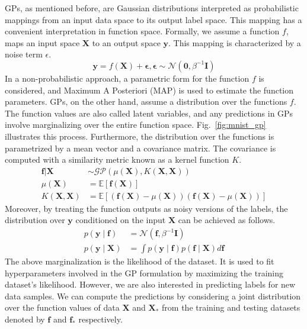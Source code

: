 \documentclass[letterpaper,11pt]{extarticle}
\begin{document}
GPs, as mentioned before, are Gaussian distributions interpreted as probabilistic mappings from an input data space to its output label space. This mapping has a convenient interpretation in function space. Formally, we assume a function $f$, maps an input space $\mathbf{X}$ to an output space $\mathbf{y}$. This mapping is characterized by a noise term $\epsilon$.
$$
\mathbf{y}=f(\mathbf{X})+\boldsymbol{\epsilon}, \boldsymbol{\epsilon} \sim \mathcal{N}\left(\mathbf{0}, \beta^{-1} \mathbf{I}\right)
$$
In a non-probabilistic approach, a parametric form for the function $f$ is considered, and Maximum A Posteriori (MAP) is used to estimate the function parameters. GPs, on the other hand, assume a distribution over the functions $f$. The function values are also called latent variables, and any predictions in GPs involve marginalizing over the entire function space. Fig.~\ref{fig:mnist_gp} illustrates this process. Furthermore, the distribution over the functions is parametrized by a mean vector and a covariance matrix. The covariance is computed with a similarity metric known as a kernel function $K$.  
$$
\begin{aligned}\mathbf{f}|\mathbf{X} & \sim \mathcal{G} \mathcal{P}\left(\mu(\mathbf{X}), K\left(\mathbf{X}, \mathbf{X}\right)\right) \\
\mu(\mathbf{X}) &=\mathbb{E}[\mathbf{f}(\mathbf{X})] \\
K\left(\mathbf{X}, \mathbf{X}\right) &=\mathbb{E}\left[(\mathbf{f}(\mathbf{X})-\mu(\mathbf{X}))\left(\mathbf{f}\left(\mathbf{X}\right)-\mu\left(\mathbf{X}\right)\right)\right]
\end{aligned}
$$
Moreover, by treating the function outputs as noisy versions of the labels, the distribution over $\mathbf{y}$ conditioned on the input $\mathbf{X}$ can be achieved as follows. 
$$
\begin{aligned}
p(\mathbf{y} \mid \mathbf{f}) &= \mathcal{N}\left(\mathbf{f}, \beta^{-1} \mathbf{I}\right) \\
p(\mathbf{y} \mid \mathbf{X}) &= \int p(\mathbf{y} \mid \mathbf{f})p(\mathbf{f} \mid \mathbf{X}) d \mathbf{f}
\end{aligned}
$$
The above marginalization is the likelihood of the dataset. It is used to fit hyperparameters involved in the GP formulation by maximizing the training dataset's likelihood. However, we are also interested in predicting labels for new data samples. We can compute the predictions by considering a joint distribution over the function values of data  $\mathbf{X}$ and $\mathbf{X}_*$ from the training and testing datasets denoted by  $\mathbf{f}$ and $\mathbf{f}_*$ respectively. 
\end{document}
